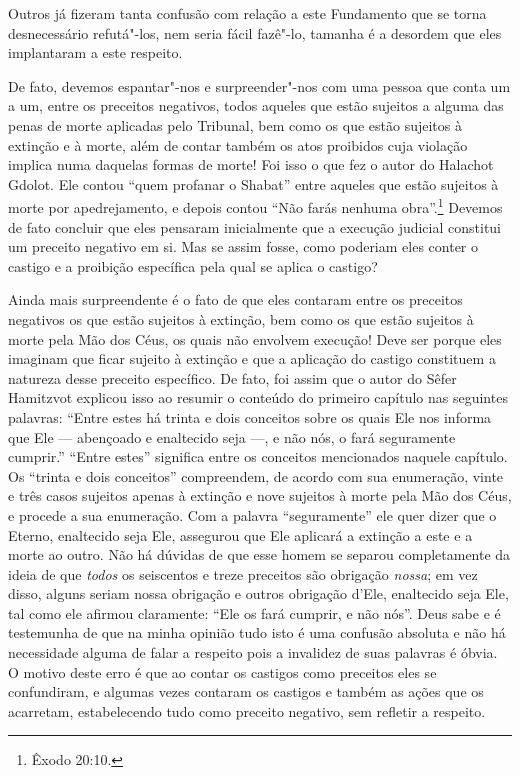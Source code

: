 Outros já fizeram tanta confusão com relação a este Fundamento que se
torna desnecessário refutá"-los, nem seria fácil fazê"-lo, tamanha é a
desordem que eles implantaram a este respeito.

De fato, devemos espantar"-nos e surpreender"-nos com uma pessoa que conta
um a um, entre os preceitos negativos, todos aqueles que estão sujeitos
a alguma das penas de morte aplicadas pelo Tribunal, bem como os que
estão sujeitos à extinção e à morte, além de contar também os atos
proibidos cuja violação implica numa daquelas formas de morte! Foi isso
o que fez o autor do Halachot Gdolot\starr. Ele contou ``quem profanar o
Shabat'' entre aqueles que estão sujeitos à morte por apedrejamento, e
depois contou ``Não farás nenhuma obra''.\footnote{Êxodo 20:10.} Devemos de fato
concluir que eles pensaram inicialmente que a execução judicial
constitui um preceito negativo em si. Mas se assim fosse, como poderiam
eles conter o castigo e a proibição específica pela qual se aplica o
castigo?

Ainda mais surpreendente é o fato de que eles contaram entre os
preceitos negativos os que estão sujeitos à extinção, bem como os que
estão sujeitos à morte pela Mão dos Céus, os quais não envolvem
execução! Deve ser porque eles imaginam que ficar sujeito à extinção e
que a aplicação do castigo constituem a natureza desse preceito
específico. De fato, foi assim que o autor do Sêfer Hamitzvot\starr{}
explicou isso ao resumir o conteúdo do primeiro capítulo nas seguintes
palavras: ``Entre estes há trinta e dois conceitos sobre os quais Ele
nos informa que Ele --- abençoado e enaltecido seja ---, e não nós, o
fará seguramente cumprir.'' ``Entre estes'' significa entre os conceitos
mencionados naquele capítulo. Os ``trinta e dois conceitos''
compreendem, de acordo com sua enumeração, vinte e três casos sujeitos
apenas à extinção e nove sujeitos à morte pela Mão dos Céus, e procede a
sua enumeração. Com a palavra ``seguramente'' ele quer dizer que o
Eterno, enaltecido seja Ele, assegurou que Ele aplicará a extinção a
este e a morte ao outro. Não há dúvidas de que esse homem se separou
completamente da ideia de que \emph{todos} os seiscentos e treze
preceitos são obrigação \emph{nossa}; em vez disso, alguns seriam nossa
obrigação e outros obrigação d'Ele, enaltecido seja Ele, tal como ele
afirmou claramente: ``Ele os fará cumprir, e não nós''. Deus sabe e é
testemunha de que na minha opinião tudo isto é uma confusão absoluta e
não há necessidade alguma de falar a respeito pois a invalidez de suas
palavras é óbvia. O motivo deste erro é que ao contar os castigos como
preceitos eles se confundiram, e algumas vezes contaram os castigos e
também as ações que os acarretam, estabelecendo tudo como preceito
negativo, sem refletir a respeito.

